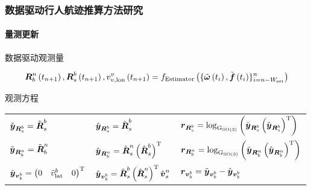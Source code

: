 \begin{frame}

	\frametitle{数据驱动行人航迹推算方法研究}	
	\framesubtitle{量测更新}
	
	{\small
		数据驱动观测量
		
		\begin{equation*}
			\label{eq:DataDrivenPedestrianMeasurementEstimator}
			\vb*{R}_{b}^{n}\left(t_{n+1}\right), \vb*{R}_{s}^{b}\left(t_{n+1}\right),v^{v}_{v, \mathrm{lon}}\left(t_{n+1}\right)
			=
			f_{\mathrm{Estimator}}\left(\{\tilde{\vb*{\omega}}\left(t_i\right), \tilde{\vb*{f}}\left(t_i\right)\}_{i = n-W_{\mathrm{est}}}^{n}\right)
		\end{equation*}
				
		观测方程
		
		\begin{center}
			\begin{tabular*}{0.8\linewidth}{@{\extracolsep{\fill}}lll}
	            $ \tilde{\vb*{y}}_{\vb*{R}_s^b} = \tilde{\vb*{R}}_s^b $ 
	            & $ \hat{\vb*{y}}_{\vb*{R}_s^b} = \hat{\vb*{R}}_s^b $ 
	            & $ \vb*{r}_{\vb*{R}_s^b} = \log_{\mathrm{G}_{\mathrm{SO}\left(3\right)}}\left(\tilde{\vb*{y}}_{\vb*{R}_s^b}\left(\hat{\vb*{y}}_{\vb*{R}_s^b}\right)^{\mathrm{T}}\right) $ 
	            \\
	            $ \tilde{\vb*{y}}_{\vb*{R}_b^n} = \tilde{\vb*{R}}_b^n $
	            & $ \hat{\vb*{y}}_{\vb*{R}_b^n} = \hat{\vb*{R}}_s^n \left(\hat{\vb*{R}}_s^b\right)^{\mathrm{T}} $ 
	            & $ \vb*{r}_{\vb*{R}_b^n} = \log_{\mathrm{G}_{\mathrm{SO}\left(3\right)}}\left(\tilde{\vb*{y}}_{\vb*{R}_b^n}\left(\hat{\vb*{y}}_{\vb*{R}_b^n}\right)^{\mathrm{T}}\right) $ 
	            \\
	            $ \tilde{\vb*{y}}_{\vb*{v}_b^b} = 
	            \begin{pmatrix}
	           		0 & \tilde{v}_{\mathrm{lat}}^b & 0
	           	\end{pmatrix}^{\mathrm{T}} $ 
	            & $ \hat{\vb*{y}}_{\vb*{v}_b^b} = \hat{\vb*{R}}_s^b \left(\hat{\vb*{R}}_s^n\right)^{\mathrm{T}} \hat{\vb*{v}}_s^n $ 
	            & $ \vb*{r}_{\vb*{v}_b^b} = \tilde{\vb*{y}}_{\vb*{v}_b^b} - \hat{\vb*{y}}_{\vb*{v}_b^b} $
	   		\end{tabular*}
   		\end{center}       
	}
 
\end{frame}


